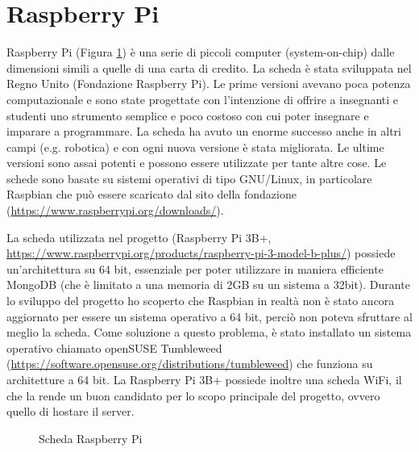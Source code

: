 \documentclass[12pt]{report}
\begin{document}
%
\section{Raspberry Pi}
%

Raspberry Pi (Figura \ref{fig:raspi}) è una serie di piccoli computer (system-on-chip) dalle dimensioni simili a quelle di una carta di credito. La scheda è stata sviluppata nel Regno Unito (Fondazione Raspberry Pi). Le prime versioni avevano poca potenza computazionale e sono state progettate con l'intenzione di offrire a insegnanti e studenti uno strumento semplice e poco costoso con cui poter insegnare e imparare a programmare. La scheda ha avuto un enorme successo anche in altri campi (e.g. robotica) e con ogni nuova versione è stata migliorata. Le ultime versioni sono assai potenti e possono essere utilizzate per tante altre cose. Le schede sono basate su sistemi operativi di tipo GNU/Linux, in particolare Raspbian che può essere scaricato dal sito della fondazione (\url{https://www.raspberrypi.org/downloads/}). 

La scheda utilizzata nel progetto (Raspberry Pi 3B+, \url{https://www.raspberrypi.org/products/raspberry-pi-3-model-b-plus/}) possiede un'architettura su 64 bit, essenziale per poter utilizzare in maniera efficiente MongoDB (che è limitato a una memoria di 2GB su un sistema a 32bit). Durante lo sviluppo del progetto ho scoperto che Raspbian in realtà non è stato ancora aggiornato per essere un sistema operativo a 64 bit, perciò non poteva sfruttare al meglio la scheda. Come soluzione a questo problema, è stato installato un sistema operativo chiamato openSUSE Tumbleweed (\url{https://software.opensuse.org/distributions/tumbleweed}) che funziona su architetture a 64 bit. 
La Raspberry Pi 3B+ possiede inoltre una scheda WiFi, il che la rende un buon candidato per lo scopo principale del progetto, ovvero quello di hostare il server.

\begin{figure}
	\caption{Scheda Raspberry Pi}
	\label{fig:raspi}
\end{figure}
\end{document}
